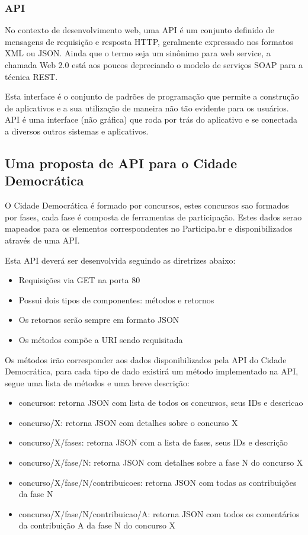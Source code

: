 \documentclass[12pt]{article}
\begin{document}
\subsubsection{API}

No contexto de desenvolvimento web, uma API é um conjunto definido de
mensagens de requisição e resposta HTTP, geralmente expressado nos formatos
XML ou JSON. Ainda que o termo seja um sinônimo para web service, a chamada Web
2.0 está aos poucos depreciando o modelo de serviços SOAP para a técnica REST.

Esta interface é o conjunto de padrões de programação que permite a construção
de aplicativos e a sua utilização de maneira não tão evidente para os
usuários. API é uma interface (não gráfica) que roda por trás do aplicativo e
se conectada a diversos outros sistemas e aplicativos.

\subsection{Uma proposta de API para o Cidade Democrática}

O Cidade Democrática é formado por concursos, estes concursos sao formados por
fases, cada fase é composta de ferramentas de participação. Estes dados serao
mapeados para os elementos correspondentes no Participa.br e disponibilizados
através de uma API.

Esta API deverá ser desenvolvida seguindo as diretrizes abaixo:

\begin{itemize}
  \item Requisições via GET na porta 80
  \item Possui dois tipos de componentes: métodos e retornos
  \item Os retornos serão sempre em formato JSON
  \item Os métodos compõe a URI sendo requisitada
\end{itemize}

Os métodos irão corresponder aos dados disponibilizados pela API do Cidade
Democrática, para cada tipo de dado existirá um método implementado na API,
segue uma lista de métodos e uma breve descrição:

\begin{itemize}
  \item concursos: retorna JSON com lista de todos os concursos, seus IDs e descricao
  \item concurso/X: retorna JSON com detalhes sobre o concurso X
  \item concurso/X/fases: retorna JSON com a lista de fases, seus IDs e descrição
  \item concurso/X/fase/N: retorna JSON com detalhes sobre a fase N do concurso X
  \item concurso/X/fase/N/contribuicoes: retorna JSON com todas as contribuições da fase N
  \item concurso/X/fase/N/contribuicao/A: retorna JSON com todos os comentários da contribuição A da fase N do concurso X
\end{itemize}
\end{document}
